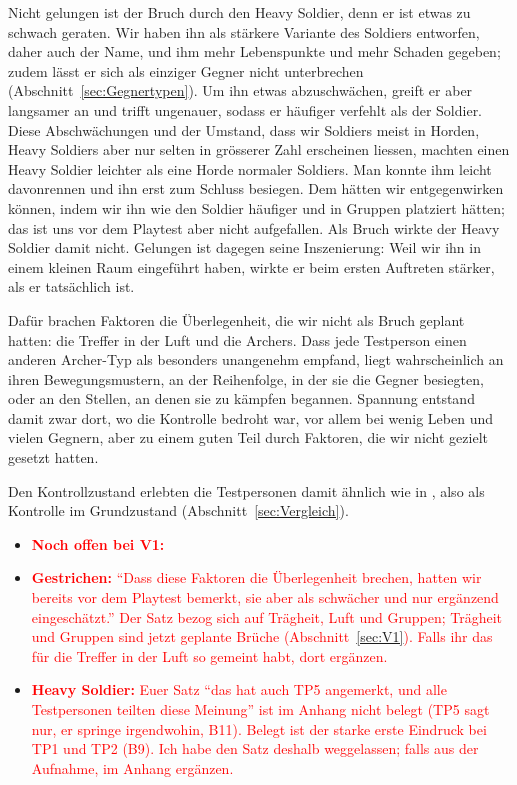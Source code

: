 \documentclass[../Main.tex]{subfiles}
\begin{document}
Nicht gelungen ist der Bruch durch den Heavy Soldier, denn er ist etwas zu schwach geraten. Wir haben ihn als stärkere Variante des Soldiers entworfen, daher auch der Name, und ihm mehr Lebenspunkte und mehr Schaden gegeben; zudem lässt er sich als einziger Gegner nicht unterbrechen (Abschnitt~\ref{sec:Gegnertypen}). Um ihn etwas abzuschwächen, greift er aber langsamer an und trifft ungenauer, sodass er häufiger verfehlt als der Soldier. Diese Abschwächungen und der Umstand, dass wir Soldiers meist in Horden, Heavy Soldiers aber nur selten in grösserer Zahl erscheinen liessen, machten einen Heavy Soldier leichter als eine Horde normaler Soldiers. Man konnte ihm leicht davonrennen und ihn erst zum Schluss besiegen. Dem hätten wir entgegenwirken können, indem wir ihn wie den Soldier häufiger und in Gruppen platziert hätten; das ist uns vor dem Playtest aber nicht aufgefallen. Als Bruch wirkte der Heavy Soldier damit nicht. Gelungen ist dagegen seine Inszenierung: Weil wir ihn in einem kleinen Raum eingeführt haben, wirkte er beim ersten Auftreten stärker, als er tatsächlich ist.

Dafür brachen Faktoren die Überlegenheit, die wir nicht als Bruch geplant hatten: die Treffer in der Luft und die Archers. Dass jede Testperson einen anderen Archer-Typ als besonders unangenehm empfand, liegt wahrscheinlich an ihren Bewegungsmustern, an der Reihenfolge, in der sie die Gegner besiegten, oder an den Stellen, an denen sie zu kämpfen begannen. Spannung entstand damit zwar dort, wo die Kontrolle bedroht war, vor allem bei wenig Leben und vielen Gegnern, aber zu einem guten Teil durch Faktoren, die wir nicht gezielt gesetzt hatten.

Den Kontrollzustand erlebten die Testpersonen damit ähnlich wie in , also als Kontrolle im Grundzustand (Abschnitt~\ref{sec:Vergleich}).

\begin{itemize}[leftmargin=1.5cm]
    \item \textcolor{red}{\textbf{Noch offen bei V1:}}
    \item \textcolor{red}{\textbf{Gestrichen:} \enquote{Dass diese Faktoren die Überlegenheit brechen, hatten wir bereits vor dem Playtest bemerkt, sie aber als schwächer und nur ergänzend eingeschätzt.} Der Satz bezog sich auf Trägheit, Luft und Gruppen; Trägheit und Gruppen sind jetzt geplante Brüche (Abschnitt~\ref{sec:V1}). Falls ihr das für die Treffer in der Luft so gemeint habt, dort ergänzen.}
    \item \textcolor{red}{\textbf{Heavy Soldier:} Euer Satz \enquote{das hat auch TP5 angemerkt, und alle Testpersonen teilten diese Meinung} ist im Anhang nicht belegt (TP5 sagt nur, er springe irgendwohin, B11). Belegt ist der starke erste Eindruck bei TP1 und TP2 (B9). Ich habe den Satz deshalb weggelassen; falls aus der Aufnahme, im Anhang ergänzen.}
\end{itemize}
\end{document}
